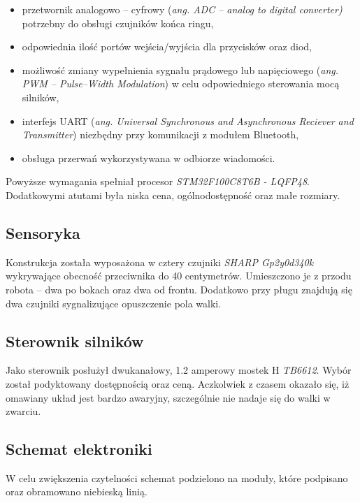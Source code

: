\begin{itemize}
\item przetwornik analogowo – cyfrowy (\textit{ang. ADC – analog to digital converter)} potrzebny do obsługi czujników końca ringu,
\item odpowiednia ilość portów wejścia/wyjścia dla przycisków oraz diod,
\item możliwość zmiany wypełnienia sygnału prądowego lub napięciowego (\textit{ang. PWM – Pulse–Width Modulation}) w celu odpowiedniego sterowania mocą silników,
\item interfejs UART (\textit{ang. Universal Synchronous and Asynchronous Reciever and Transmitter}) niezbędny przy komunikacji z modułem Bluetooth,
\item obsługa przerwań wykorzystywana w odbiorze wiadomości.
\end{itemize}

Powyższe wymagania spełniał procesor \textit{STM32F100C8T6B - LQFP48}. Dodatkowymi atutami była niska cena, ogólnodostępność oraz małe rozmiary.

\subsection{Sensoryka}
Konstrukcja została wyposażona w cztery czujniki \textit{SHARP Gp2y0d340k} wykrywające obecność przeciwnika do 40 centymetrów. Umieszczono je z przodu robota – dwa po bokach oraz dwa od frontu. Dodatkowo przy pługu znajdują się dwa czujniki sygnalizujące opuszczenie pola walki.

\subsection{Sterownik silników}
Jako sterownik posłużył dwukanałowy, 1.2 amperowy mostek H \textit{TB6612}. Wybór został podyktowany dostępnością oraz ceną. Aczkolwiek z czasem okazało się, iż omawiany układ jest bardzo awaryjny, szczególnie nie nadaje się do walki w zwarciu.

\subsection{Schemat elektroniki}
W celu zwiększenia czytelności schemat podzielono na moduły, które podpisano oraz obramowano niebieską linią. 

